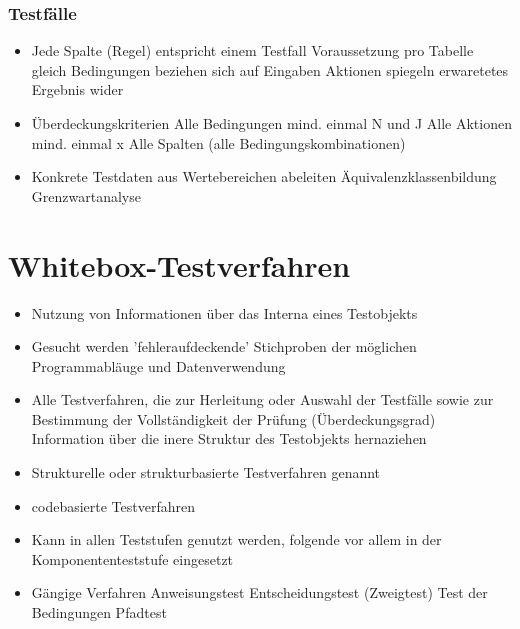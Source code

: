 \documentclass{report}
\theoremstyle{definition}
\theoremstyle{example}
\begin{document}
\subsubsection{Testfälle}
\begin{itemize}
   \item Jede Spalte (Regel) entspricht einem Testfall
   \subitem Voraussetzung pro Tabelle gleich
   \subitem Bedingungen beziehen sich auf Eingaben
   \subitem Aktionen spiegeln erwaretetes Ergebnis wider 
   \item Überdeckungskriterien
   \subitem Alle Bedingungen mind. einmal N und J
   \subitem Alle Aktionen mind. einmal x
   \subitem Alle Spalten (alle Bedingungskombinationen)
   \item Konkrete Testdaten aus Wertebereichen abeleiten
   \subitem Äquivalenzklassenbildung
   \subitem Grenzwartanalyse 
\end{itemize}


\section{Whitebox-Testverfahren}
\begin{itemize}
   \item Nutzung von Informationen über das Interna eines Testobjekts
   \item Gesucht werden 'fehleraufdeckende' Stichproben der möglichen Programmabläuge und Datenverwendung
   \item Alle Testverfahren, die zur Herleitung oder Auswahl der Testfälle sowie zur Bestimmung der Vollständigkeit der Prüfung (Überdeckungsgrad) Information über die inere Struktur des Testobjekts hernaziehen
   \item Strukturelle oder strukturbasierte Testverfahren genannt
   \item codebasierte Testverfahren
   \item Kann in allen Teststufen genutzt werden, folgende vor allem in der Komponententeststufe eingesetzt
   \item Gängige Verfahren
   \subitem Anweisungstest
   \subitem Entscheidungstest (Zweigtest)
   \subitem Test der Bedingungen
   \subitem Pfadtest 
\end{itemize}
\end{document}
